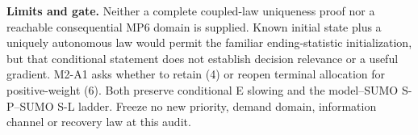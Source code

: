 \documentclass[11pt,a4paper]{article}
\begin{document}
\textbf{Limits and gate.} Neither a complete coupled-law uniqueness proof
nor a reachable consequential MP6 domain is supplied. Known initial state
plus a uniquely autonomous law would permit the familiar ending-statistic
initialization, but that conditional statement does not establish decision
relevance or a useful gradient. M2-A1 asks whether to retain (4) or reopen
terminal allocation for positive-weight (6). Both preserve conditional E
slowing and the model--SUMO S-P--SUMO S-L ladder. Freeze no new priority,
demand domain, information channel or recovery law at this audit.
\end{document}
